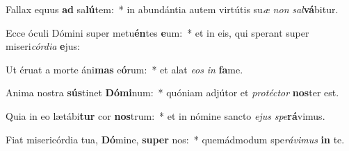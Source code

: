 \item Fallax equus \textbf{ad} sa\textbf{lú}tem:~* in abundántia autem virtútis su\textit{æ} \textit{non} \textit{sal}\textbf{vá}bitur.
\item Ecce óculi Dómini super metu\textbf{én}tes \textbf{e}um:~* et in eis, qui sperant super miseri\textit{cór}\textit{di}\textit{a} \textbf{e}jus:
\item Ut éruat a morte áni\textbf{mas} e\textbf{ó}rum:~* et alat \textit{e}\textit{os} \textit{in} \textbf{fa}me.
\item Anima nostra \textbf{sús}tinet \textbf{Dó}\textbf{mi}num:~* quóniam adjútor et \textit{pro}\textit{téc}\textit{tor} \textbf{nos}ter est.
\item Quia in eo lætábi\textbf{tur} cor \textbf{nos}trum:~* et in nómine sancto \textit{e}\textit{jus} \textit{spe}\textbf{rá}vimus.
\item Fiat misericórdia tua, \textbf{Dó}mine, \textbf{su}\textbf{per} nos:~* quemádmodum spe\textit{rá}\textit{vi}\textit{mus} \textbf{in} te.
